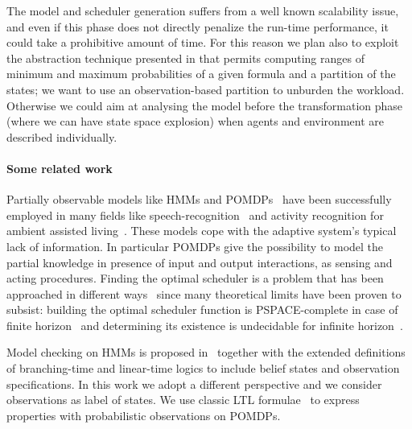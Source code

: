 The model and scheduler generation suffers from a well known scalability issue, and even if this phase does not directly penalize the run-time performance, it could take a prohibitive amount of time. For this reason we plan also to exploit the abstraction technique presented in \cite{KattenbeltKNP10} that permits computing ranges of minimum and maximum probabilities of a given formula and a partition of the states; we want to use an observation-based partition to unburden the workload. 
Otherwise we could aim at analysing the model before the transformation phase (where we can have state space explosion) when agents and environment are described individually.  

\vspace{-.35cm}
\paragraph{Some related work} %
\label{par:literature_review}
Partially observable models like \acp{HMM} \cite{Rabiner90} and \acp{POMDP}~\cite{cassandra1998survey} have been successfully employed in many fields like speech-recognition~\cite{Rabiner90} and activity recognition for ambient assisted living~\cite{vicario2015continuous}.
These models cope with
the adaptive system's typical lack of information.
In particular \acp{POMDP} give the possibility to model the partial knowledge in presence of input and output interactions, as sensing and acting procedures. Finding the optimal scheduler is a problem that has been approached in different ways~\cite{LittmanCK95} since many theoretical limits have been proven to subsist: building the optimal scheduler function is PSPACE-complete in case of finite horizon~\cite{Papadimitriou1987} and determining its existence is undecidable for infinite horizon~\cite{MadaniHC99}.

Model checking on \acp{HMM} is proposed in~\cite{ZhangHJ05} together with the extended definitions of branching-time and linear-time logics to include belief states and observation specifications. In this work we adopt a different perspective and we consider observations as label of states. We use classic \ac{LTL} formulae~\cite{Pnueli77} to express properties with probabilistic observations on \acp{POMDP}. 

